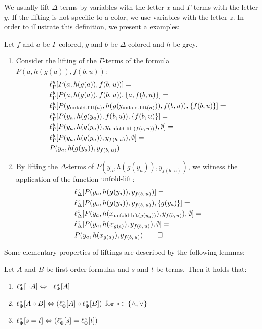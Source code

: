 We usually lift $\Delta$-terms by variables with the letter $x$ and $\Gamma$-terms with the letter\nolinebreak{} $y$. If the lifting is not specific to a color, we use variables with the letter\nolinebreak{} $z$.
In order to illustrate this definition, we present a examples:

\begin{exa}
	Let $f$ and $a$ be $\Gamma$-colored, $g$ and $b$ be $\Delta$-colored and $h$ be grey.
	\begin{enumerate}
		\item
			Consider the lifting of the $\Gamma$-terms of the formula $P(a, h(g(a)), f(b, u))$:
			\begin{align*}
				& \lifgamma{ P(a, h(g(a)), f(b, u)) } = \\
		 & \lifgamma{ P(a, h(g(a)), f(b, u)), \{a, f(b, u)\} } = \\
		 & \lifgamma{ P(y_{\expa(a)}, h(g(y_{\expa(a)})), f(b, u)), \{f(b, u)\} } = \\
		& \lifgamma{ P(y_a, h(g(y_a)), f(b, u)), \{f(b, u)\} } = \\
		& \lifgamma{ P(y_a, h(g(y_a)), y_{\expa(f(b,\,u))}), \emptyset } = \\
		& \lifgamma{ P(y_a, h(g(y_a)), y_{f(b,\,u)}), \emptyset } = \\
		& P(y_a, h(g(y_a)), y_{f(b,\,u)})
			\end{align*}

		\item
			By lifting the $\Delta$-terms of $P(y_a, h(g(y_a)), y_{f(b,\,u)})$, we witness the application of the function $\expa$:
			\begin{align*}
				& \lifdelta{ P(y_a, h(g(y_a)), y_{f(b,\,u)}) } = \\
			& \lifdelta{ P(y_a, h(g(y_a)), y_{f(b,\,u)}), \{g(y_a)\} } = \\
		 & \lifdelta{P(y_a, h(x_{\expa(g(y_a))}), y_{f(b,\,u)}), \emptyset } = \\
		 & \lifdelta{P(y_a, h(x_{g(a)}), y_{f(b,\,u)}), \emptyset } = \\
		 & P(y_a, h(x_{g(a)}), y_{f(b,\,u)})
			\qedhere
			\end{align*}
	\end{enumerate}
\end{exa}

Some elementary properties of liftings are described by the following lemmas:


\begin{lemma}
	\label{lemma:lift_logic_commute}
	Let $A$ and $B$ be first-order formulas and $s$ and $t$ be terms. Then it holds that:
	\begin{enumerate}
		\item $\lift{\Phi}{\lnot A}{z} \spas\semiff{} \lnot \lift{\Phi}{A}{z}$
		\item $\lift{\Phi}{A \circ B}{z} \spas\semiff{} ( \lift{\Phi}{A}{z} \circ \lift{\Phi}{B}{z} )$ for $\circ \in \{\land, \lor\}$
		\item $\lift{\Phi}{s = t}{z} \spas\semiff{} ( \lift{\Phi}{s}{z} = \lift{\Phi}{t}{z} )$
			\hfill\lemmaqed
	\end{enumerate}
\end{lemma}


